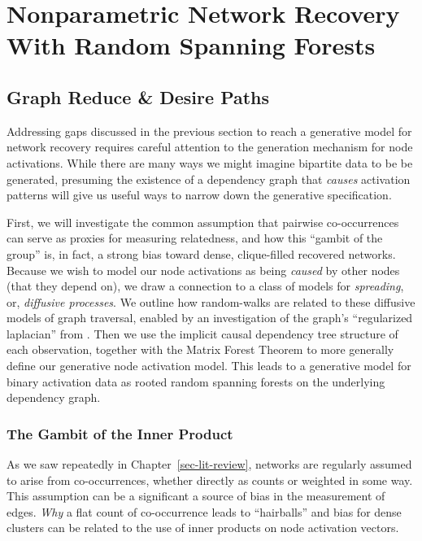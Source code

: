 \documentclass[%
	12pt,
		oneside,
		letterpaper
]{book}
\begin{document}
\part{Nonparametric Network Recovery With Random Spanning Forests}

\chapter{Graph Reduce \& Desire Paths}\label{graph-reduce-desire-paths}

Addressing gaps discussed in the previous section to reach a generative
model for network recovery requires careful attention to the generation
mechanism for node activations. While there are many ways we might
imagine bipartite data to be be generated, presuming the existence of a
dependency graph that \emph{causes} activation patterns will give us
useful ways to narrow down the generative specification.

First, we will investigate the common assumption that pairwise
co-occurrences can serve as proxies for measuring relatedness, and how
this ``gambit of the group'' is, in fact, a strong bias toward dense,
clique-filled recovered networks. Because we wish to model our node
activations as being \emph{caused} by other nodes (that they depend on),
we draw a connection to a class of models for \emph{spreading}, or,
\emph{diffusive processes}. We outline how random-walks are related to
these diffusive models of graph traversal, enabled by an investigation
of the graph's ``regularized laplacian'' from
\textcite{Semisupervisedlearning_Avrachenkov2017}. Then we use the
implicit causal dependency tree structure of each observation, together
with the Matrix Forest Theorem
\autocite{MatrixForestTheorem_Chebotarev2006,Countingrootedforests_Knill2013}
to more generally define our generative node activation model. This
leads to a generative model for binary activation data as rooted random
spanning forests on the underlying dependency graph.

\section{The Gambit of the Inner Product}\label{sec-clique-bias}

As we saw repeatedly in Chapter~\ref{sec-lit-review}, networks are
regularly assumed to arise from co-occurrences, whether directly as
counts or weighted in some way. This assumption can be a significant a
source of bias in the measurement of edges. \emph{Why} a flat count of
co-occurrence leads to ``hairballs'' and bias for dense clusters can be
related to the use of inner products on node activation vectors.
\end{document}
